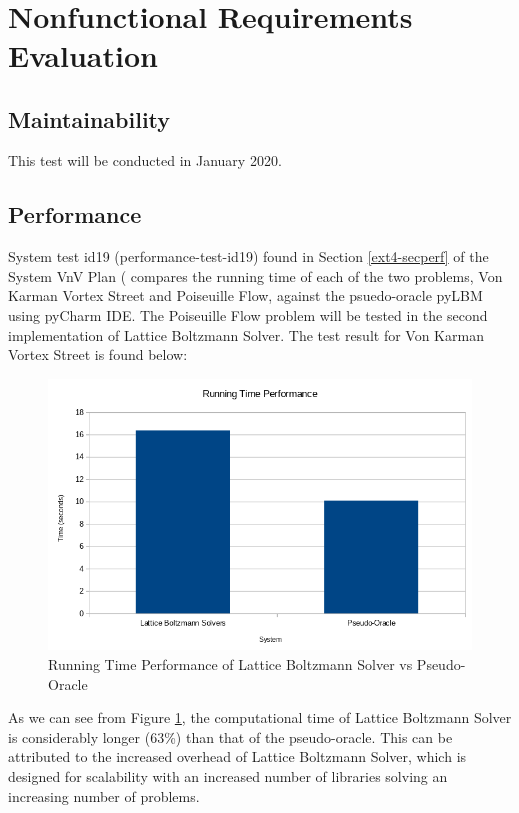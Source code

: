 \documentclass[12pt, titlepage]{article}
\newcommand{\myprogname}{Lattice Boltzmann Solver}
\begin{document}
~\newpage

\section{Nonfunctional Requirements Evaluation}

\subsection{Maintainability}

This test will be conducted in January 2020.
		
\subsection{Performance}

System test id19 (performance-test-id19) found in Section \ref{ext4-secperf} of the System VnV Plan (\citet{LBM_SVNV_PM} compares the running time of each of the two problems, Von Karman Vortex Street and Poiseuille Flow, against the psuedo-oracle pyLBM using pyCharm IDE. The Poiseuille Flow problem will be tested in the second implementation of {\myprogname}. The test result for Von Karman Vortex Street is found below:


\begin{figure}[h!]
	\begin{center}
		\includegraphics[width=1.0\textwidth]{runtimeperf}
		\caption{Running Time Performance of {\myprogname} vs Pseudo-Oracle}
		\label{Fig_RunningTimePerformance}
	\end{center}
\end{figure}

\noindent As we can see from Figure \ref{Fig_RunningTimePerformance}, the computational time of {\myprogname} is considerably longer (63\%) than that of the pseudo-oracle. This can be attributed to the increased overhead of {\myprogname}, which is designed for scalability with an increased number of libraries solving an increasing number of problems.
\end{document}
